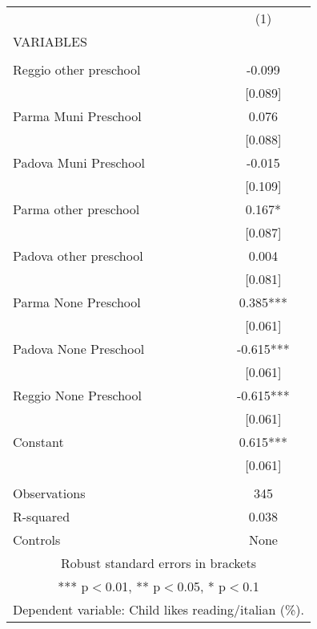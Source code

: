 \begin{tabular}{lc} \hline
 & (1) \\
VARIABLES &  \\ \hline
 &  \\
Reggio other preschool & -0.099 \\
 & [0.089] \\
Parma Muni Preschool & 0.076 \\
 & [0.088] \\
Padova Muni Preschool & -0.015 \\
 & [0.109] \\
Parma other preschool & 0.167* \\
 & [0.087] \\
Padova other preschool & 0.004 \\
 & [0.081] \\
Parma None Preschool & 0.385*** \\
 & [0.061] \\
Padova None Preschool & -0.615*** \\
 & [0.061] \\
Reggio None Preschool & -0.615*** \\
 & [0.061] \\
Constant & 0.615*** \\
 & [0.061] \\
 &  \\
Observations & 345 \\
R-squared & 0.038 \\
 Controls & None \\ \hline
\multicolumn{2}{c}{ Robust standard errors in brackets} \\
\multicolumn{2}{c}{ *** p$<$0.01, ** p$<$0.05, * p$<$0.1} \\
\multicolumn{2}{c}{ Dependent variable: Child likes reading/italian (\%).} \\
\end{tabular}
